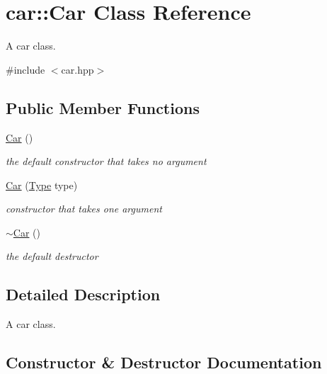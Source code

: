 \hypertarget{classcar_1_1_car}{}\section{car\+:\+:Car Class Reference}
\label{classcar_1_1_car}


A car class.  




{\ttfamily \#include $<$car.\+hpp$>$}

\subsection*{Public Member Functions}
\begin{DoxyCompactItemize}
\item 
\hypertarget{classcar_1_1_car_ac25fd3c38dbd6caf3a7ab05eab0e2179}{}\label{classcar_1_1_car_ac25fd3c38dbd6caf3a7ab05eab0e2179} 
\hyperlink{classcar_1_1_car_ac25fd3c38dbd6caf3a7ab05eab0e2179}{Car} ()
\begin{DoxyCompactList}\small\item\em the default constructor that takes no argument \end{DoxyCompactList}\item 
\hyperlink{classcar_1_1_car_a4335b7dac7d5b658e38ee3c458ea7683}{Car} (\hyperlink{namespacecar_a5a73671161a4e115408b2d713d3280a6}{Type} type)
\begin{DoxyCompactList}\small\item\em constructor that takes one argument \end{DoxyCompactList}\item 
\hypertarget{classcar_1_1_car_a46a86759ddb6092fcb99ee1037372322}{}\label{classcar_1_1_car_a46a86759ddb6092fcb99ee1037372322} 
\hyperlink{classcar_1_1_car_a46a86759ddb6092fcb99ee1037372322}{$\sim$\+Car} ()
\begin{DoxyCompactList}\small\item\em the default destructor \end{DoxyCompactList}\end{DoxyCompactItemize}


\subsection{Detailed Description}
A car class. 

\subsection{Constructor \& Destructor Documentation}
\hypertarget{classcar_1_1_car_a4335b7dac7d5b658e38ee3c458ea7683}{}\label{classcar_1_1_car_a4335b7dac7d5b658e38ee3c458ea7683} 
